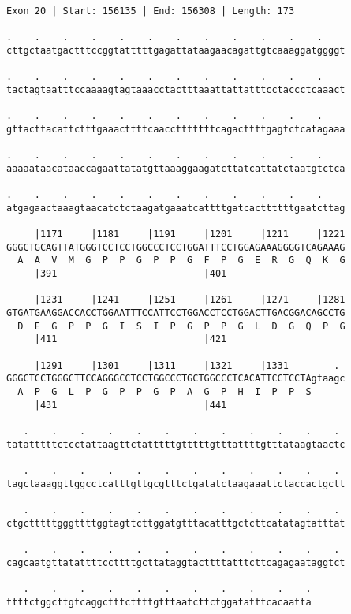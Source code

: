 \documentclass{article}
\begin{document}
\begin{Verbatim}
Exon 20 | Start: 156135 | End: 156308 | Length: 173
 
.    .    .    .    .    .    .    .    .    .    .    .    
cttgctaatgactttccggtatttttgagattataagaacagattgtcaaaggatggggt
  
.    .    .    .    .    .    .    .    .    .    .    .    
tactagtaatttccaaaagtagtaaacctactttaaattattatttcctaccctcaaact
  
.    .    .    .    .    .    .    .    .    .    .    .    
gttacttacattctttgaaacttttcaacctttttttcagacttttgagtctcatagaaa
  
.    .    .    .    .    .    .    .    .    .    .    .    
aaaaataacataaccagaattatatgttaaaggaagatcttatcattatctaatgtctca
  
.    .    .    .    .    .    .    .    .    .    .    .    
atgagaactaaagtaacatctctaagatgaaatcattttgatcacttttttgaatcttag
  
     |1171     |1181     |1191     |1201     |1211     |1221
GGGCTGCAGTTATGGGTCCTCCTGGCCCTCCTGGATTTCCTGGAGAAAGGGGTCAGAAAG
  A  A  V  M  G  P  P  G  P  P  G  F  P  G  E  R  G  Q  K  G
     |391                          |401                     
  
     |1231     |1241     |1251     |1261     |1271     |1281
GTGATGAAGGACCACCTGGAATTTCCATTCCTGGACCTCCTGGACTTGACGGACAGCCTG
  D  E  G  P  P  G  I  S  I  P  G  P  P  G  L  D  G  Q  P  G
     |411                          |421                     
  
     |1291     |1301     |1311     |1321     |1331        . 
GGGCTCCTGGGCTTCCAGGGCCTCCTGGCCCTGCTGGCCCTCACATTCCTCCTAgtaagc
  A  P  G  L  P  G  P  P  G  P  A  G  P  H  I  P  P  S      
     |431                          |441                     
  
   .    .    .    .    .    .    .    .    .    .    .    . 
tatatttttctcctattaagttctatttttgtttttgtttattttgtttataagtaactc
  
   .    .    .    .    .    .    .    .    .    .    .    . 
tagctaaaggttggcctcatttgttgcgtttctgatatctaagaaattctaccactgctt
  
   .    .    .    .    .    .    .    .    .    .    .    . 
ctgctttttgggttttggtagttcttggatgtttacatttgctcttcatatagtatttat
  
   .    .    .    .    .    .    .    .    .    .    .    . 
cagcaatgttatattttccttttgcttataggtacttttatttcttcagagaataggtct
  
   .    .    .    .    .    .    .    .    .    .    .
ttttctggcttgtcaggctttcttttgtttaatcttctggatatttcacaatta
\end{Verbatim}
\end{document}
